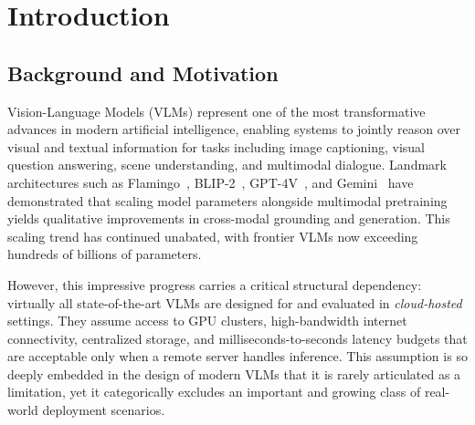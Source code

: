 \chapter{Introduction}
\label{cha:intro}

\section{Background and Motivation}
\label{sec:intro_background}

Vision-Language Models (VLMs) represent one of the most transformative advances in modern artificial intelligence, enabling systems to jointly reason over visual and textual information for tasks including image captioning, visual question answering, scene understanding, and multimodal dialogue. Landmark architectures such as Flamingo~\cite{alayrac2022flamingo}, BLIP-2~\cite{li2023blip2}, GPT-4V~\cite{openai2023gpt4}, and Gemini~\cite{team2023gemini} have demonstrated that scaling model parameters alongside multimodal pretraining yields qualitative improvements in cross-modal grounding and generation. This scaling trend has continued unabated, with frontier VLMs now exceeding hundreds of billions of parameters.

However, this impressive progress carries a critical structural dependency: virtually all state-of-the-art VLMs are designed for and evaluated in \emph{cloud-hosted} settings. They assume access to GPU clusters, high-bandwidth internet connectivity, centralized storage, and milliseconds-to-seconds latency budgets that are acceptable only when a remote server handles inference. This assumption is so deeply embedded in the design of modern VLMs that it is rarely articulated as a limitation, yet it categorically excludes an important and growing class of real-world deployment scenarios.

